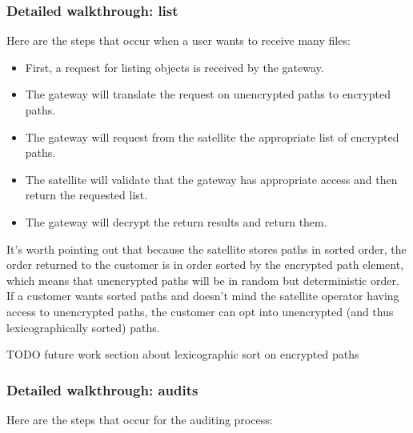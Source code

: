 \documentclass[a4paper,10pt]{article} \usepackage[utf8]{inputenc}
\newcommand{\todo}[1]{{\color{red} TODO #1 }}
\begin{document}
\subsubsection{Detailed walkthrough: list}

Here are the steps that occur when a user wants to receive many files:

\begin{itemize}
\item First, a request for listing objects is received by the gateway.
\item The gateway will translate the request on unencrypted paths to encrypted
  paths.
\item The gateway will request from the satellite the appropriate list of
  encrypted paths.
\item The satellite will validate that the gateway has appropriate access
  and then return the requested list.
\item The gateway will decrypt the return results and return them.
\end{itemize}

It's worth pointing out that because the satellite stores paths in sorted
order, the order returned to the customer is in order sorted by the encrypted
path element, which means that unencrypted paths will be in random but
deterministic order. If a customer wants sorted paths and doesn't mind the
satellite operator having access to unencrypted paths, the customer can opt
into unencrypted (and thus lexicographically sorted) paths.

\todo{future work section about lexicographic sort on encrypted paths}

\subsubsection{Detailed walkthrough: audits}

Here are the steps that occur for the auditing process:
\end{document}
